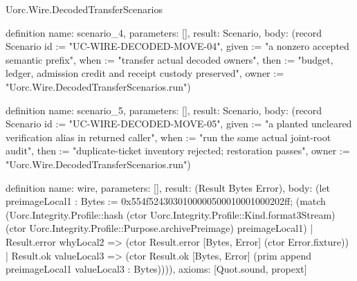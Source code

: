 \begin{lexlean}{Uorc.Wire.DecodedTransferScenarios}
\begin{semanticmodule}
definition{
  name: scenario_4,
  parameters: [],
  result: Scenario,
  body: (record Scenario {id := "UC-WIRE-DECODED-MOVE-04", given := "a nonzero accepted semantic prefix", when := "transfer actual decoded owners", then := "budget, ledger, admission credit and receipt custody preserved", owner := "Uorc.Wire.DecodedTransferScenarios.run"})
}

definition{
  name: scenario_5,
  parameters: [],
  result: Scenario,
  body: (record Scenario {id := "UC-WIRE-DECODED-MOVE-05", given := "a planted uncleared verification alias in returned caller", when := "run the same actual joint-root audit", then := "duplicate-ticket inventory rejected; restoration passes", owner := "Uorc.Wire.DecodedTransferScenarios.run"})
}

definition{
  name: wire,
  parameters: [],
  result: (Result Bytes Error),
  body: (let preimageLocal1 : Bytes := 0x554f5243030100000500010001000202ff; (match (Uorc.Integrity.Profile::hash (ctor Uorc.Integrity.Profile::Kind.format3Stream) (ctor Uorc.Integrity.Profile::Purpose.archivePreimage) preimageLocal1)
    | Result.error whyLocal2 => (ctor Result.error [Bytes, Error] (ctor Error.fixture))
    | Result.ok valueLocal3 => (ctor Result.ok [Bytes, Error] (prim append preimageLocal1 valueLocal3 : Bytes)))),
  axioms: [Quot.sound, propext]
}


\end{semanticmodule}
\end{lexlean}
